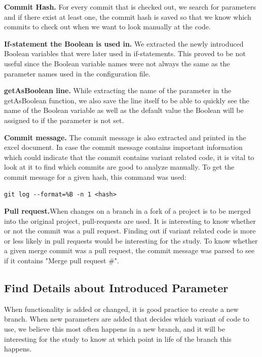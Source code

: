 \textbf{Commit Hash.} For every commit that is checked out, we search for parameters and if there exist at least one, the commit hash is saved so that we know which commits to check out when we want to look manually at the code.

\textbf{If-statement the Boolean is used in.} We extracted the newly introduced Boolean variables that were later used in if-statements. This proved to be not useful since the Boolean variable names were not always the same as the parameter names used in the configuration file.

\textbf{getAsBoolean line.} While extracting the name of the parameter in the getAsBoolean function, we also save the line itself to be able to quickly see the name of the Boolean variable as well as the default value the Boolean will be assigned to if the parameter is not set.

\textbf{Commit message.} The commit message is also extracted and printed in the excel document. In case the commit message contains important information which could indicate that the commit contains variant related code, it is vital to look at it to find which commits are good to analyze manually.
To get the commit message for a given hash, this command was used:
\lstset{language=Bash,numbers=left,xleftmargin=2em,frame=single,framexleftmargin=1.5em}
\begin{lstlisting}[frame=single,breaklines=true,tabsize=2]
git log --format=%B -n 1 <hash>
\end{lstlisting}

\textbf{Pull request.}When changes on a branch in a fork of a project is to be merged into the original project, pull-requests are used. It is interesting to know whether or not the commit was a pull request. Finding out if variant related code is more or less likely in pull requests would be interesting for the study. To know whether a given merge commit was a pull request, the commit message was parsed to see if it contains "Merge pull request \#".
\subsection{Find Details about Introduced Parameter}
When functionality is added or changed, it is good practice to create a new branch. When new parameters are added that decides which variant of code to use, we believe this most often happens in a new branch, and it will be interesting for the study to know at which point in life of the branch this happens.

